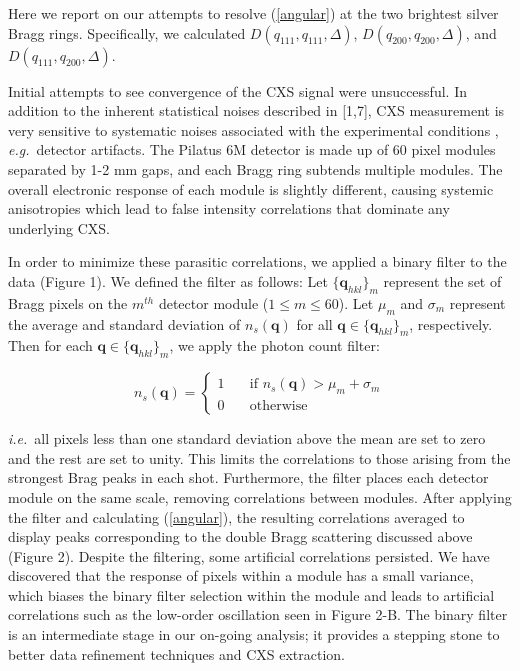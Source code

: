 \documentclass [11pt,fleqn]{article}
\begin{document}
Here we report on our attempts to resolve (\ref{angular}) at the two brightest silver Bragg rings. Specifically, we calculated $D (q_{111},q_{111}, \Delta  )$, $D (q_{200},q_{200}, \Delta  )$, and $D (q_{111},q_{200}, \Delta  )$. 

Initial attempts to see convergence of the CXS signal were unsuccessful. In addition to the inherent statistical noises described in [1,7], CXS measurement  is very sensitive to systematic noises associated with the experimental conditions \cite{Kam:1981ua}, \textit{e.g.}~detector artifacts. The Pilatus 6M detector is made up of 60 pixel modules separated by 1-2 mm gaps, and each Bragg ring subtends multiple modules. The overall electronic response of each module is slightly different, causing systemic anisotropies which lead to false intensity correlations that dominate any underlying CXS. 

In order to minimize these parasitic correlations, we applied a binary filter to the data (Figure 1). We defined the filter as follows: Let $\{ \bm q_{hkl} \}_{m}$ represent the set of Bragg pixels on the $m^{th}$ detector module ($1 \leq m \leq 60$). Let $\mu_m$ and $\sigma_m$ represent the average and standard deviation of $n_{s}(\bm q)$  for all $\bm q \in \{ \bm q_{hkl} \}_{m} $, respectively. Then for each $\bm q \in \{ \bm q_{hkl} \}_{m} $, we apply the photon count filter:

\[  n_{s}(\bm q ) = 
 \begin{cases} 
   1 & \quad \text{if } n_{s}(\bm q ) > \mu_m +  \sigma_m\\
   0 & \quad \text{otherwise} 
 \end{cases} 
 \]

\textit{i.e.}~all pixels less than one standard deviation above the mean are set to zero and the rest are set to unity. This limits the correlations to those arising from the strongest Brag peaks in each shot. Furthermore, the filter places each detector module on the same scale, removing correlations between modules.  After applying the filter and calculating (\ref{angular}), the resulting correlations averaged to display peaks corresponding to the double Bragg scattering discussed above (Figure 2). Despite the filtering, some artificial correlations persisted. We have discovered that the response of pixels within a module has a small variance,  which biases the binary filter selection within the module and leads to artificial correlations such as the low-order oscillation seen in Figure 2-B. The binary filter is an intermediate stage in our on-going analysis; it provides a stepping stone to better data refinement techniques and CXS extraction.
\end{document}
